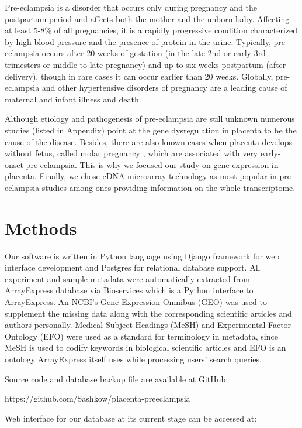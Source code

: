 \documentclass[conference]{IEEEtran}
\begin{document}
Pre-eclampsia \cite{AboutPre21} is a disorder that occurs only during pregnancy and the postpartum period and affects both the mother and the unborn baby. Affecting at least 5-8\% of all pregnancies, it is a rapidly progressive condition characterized by high blood pressure and the presence of protein in the urine. Typically, pre-eclampsia occurs after 20 weeks of gestation (in the late 2nd or early 3rd trimesters or middle to late pregnancy) and up to six weeks postpartum (after delivery), though in rare cases it can occur earlier than 20 weeks. Globally, pre-eclampsia and other hypertensive disorders of pregnancy are a leading cause of maternal and infant illness and death. 

Although etiology and pathogenesis of pre-eclampsia are still unknown numerous studies (listed in Appendix) point at the gene dysregulation in placenta to be the cause of the disease. Besides, there are also known cases when placenta develops without fetus, called molar pregnancy \cite{MolarPregnancy}, which are associated with very early-onset pre-eclampsia. This is why we focused our study on gene expression in placenta. Finally, we chose cDNA microarray technology as most popular in pre-eclampsia studies among ones providing information on the whole transcriptome.

\section{Methods}

Our software is written in Python language using Django framework for web interface development and Postgres for relational database support. All experiment and sample metadata were automatically extracted from ArrayExpress database via Bioservices which is a Python interface to ArrayExpress. An NCBI's Gene Expression Omnibus (GEO) was used to supplement the missing data along with the corresponding scientific articles and authors personally. Medical Subject Headings (MeSH) and Experimental Factor Ontology (EFO)  were used as a standard for terminology in metadata, since MeSH is used to codify keywords in biological scientific articles and EFO is an ontology ArrayExpress itself uses while processing users' search queries.

Source code and database backup file are available at GitHub:

https://github.com/Sashkow/placenta-preeclampsia

Web interface for our database at its current stage can be accessed at:
\end{document}
